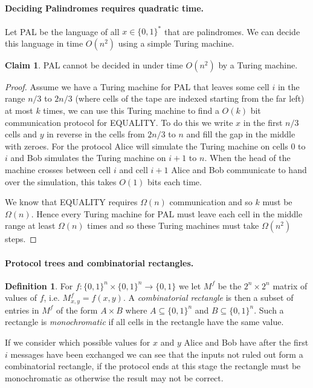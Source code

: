 \documentclass[11pt,a4paper]{article}
\theoremstyle{definition}
\newtheorem{claim}{Claim}
\newtheorem{defn}{Definition}
\begin{document}
\paragraph{Deciding Palindromes requires quadratic time.}
Let PAL be the language of all $x\in \{0,1\}^*$ that are palindromes.
We can decide this language in time $O(n^2)$ using a simple Turing machine.
\begin{claim}
PAL cannot be decided in under time $O(n^2)$ by a Turing machine.
\end{claim}
\begin{proof}
Assume we have a Turing machine for PAL that leaves some cell $i$ in the range $n/3$ to $2n/3$ (where cells of the tape are indexed starting from the far left) at most $k$ times, we can use this Turing machine to find a $O(k)$ bit communication protocol for EQUALITY.
To do this we write $x$ in the first $n/3$ cells and $y$ in reverse in the cells from $2n/3$ to $n$ and fill the gap in the middle with zeroes.
For the protocol Alice will simulate the Turing machine on cells $0$ to $i$ and Bob simulates the Turing machine on $i+1$ to $n$.
When the head of the machine crosses between cell $i$ and cell $i+1$ Alice and Bob communicate to hand over the simulation, this takes $O(1)$ bits each time.

We know that EQUALITY requires $\Omega(n)$ communication and so $k$ must be $\Omega(n)$.
Hence every Turing machine for PAL must leave each cell in the middle range at least $\Omega(n)$ times and so these Turing machines must take $\Omega(n^2)$ steps.
\end{proof}

\paragraph{Protocol trees and combinatorial rectangles.}
\begin{defn}
For $f\colon \{0,1\}^n \times \{0,1\}^n \to \{0,1\}$ we let $M^f$ be the $2^n \times 2^n$ matrix of values of $f$, i.e. $M^f_{x,y} = f(x,y)$.
A \emph{combinatorial rectangle} is then a subset of entries in $M^f$ of the form $A\times B$ where $A\subseteq \{0,1\}^n$ and $B\subseteq \{0,1\}^n$.
Such a rectangle is \emph{monochromatic} if all cells in the rectangle have the same value.
\end{defn}

If we consider which possible values for $x$ and $y$ Alice and Bob have after the first $i$ messages have been exchanged we can see that the inputs not ruled out form a combinatorial rectangle, if the protocol ends at this stage the rectangle must be monochromatic as otherwise the result may not be correct.
\end{document}
